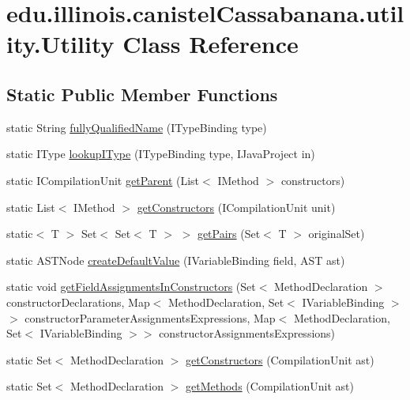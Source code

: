 \hypertarget{classedu_1_1illinois_1_1canistelCassabanana_1_1utility_1_1Utility}{
\section{edu.illinois.canistelCassabanana.utility.Utility Class Reference}
\label{classedu_1_1illinois_1_1canistelCassabanana_1_1utility_1_1Utility}
}
\subsection*{Static Public Member Functions}
\begin{DoxyCompactItemize}
\item 
static String \hyperlink{classedu_1_1illinois_1_1canistelCassabanana_1_1utility_1_1Utility_a7ad7b01b4ac985f843daae80a9b530f6}{fullyQualifiedName} (ITypeBinding type)
\item 
static IType \hyperlink{classedu_1_1illinois_1_1canistelCassabanana_1_1utility_1_1Utility_add7cd8f4956b7b5ebd90c8542183f21e}{lookupIType} (ITypeBinding type, IJavaProject in)
\item 
static ICompilationUnit \hyperlink{classedu_1_1illinois_1_1canistelCassabanana_1_1utility_1_1Utility_a45eff2f6304ebeb68bc077e77faaf41c}{getParent} (List$<$ IMethod $>$ constructors)
\item 
static List$<$ IMethod $>$ \hyperlink{classedu_1_1illinois_1_1canistelCassabanana_1_1utility_1_1Utility_a6cd2cf1ed4823a36a63fb36b4c31cdea}{getConstructors} (ICompilationUnit unit)
\item 
static$<$ T $>$ Set$<$ Set$<$ T $>$ $>$ \hyperlink{classedu_1_1illinois_1_1canistelCassabanana_1_1utility_1_1Utility_aa8be57d974d02d56e0ae832bedcdee08}{getPairs} (Set$<$ T $>$ originalSet)
\item 
static ASTNode \hyperlink{classedu_1_1illinois_1_1canistelCassabanana_1_1utility_1_1Utility_a4dac6bf635efbf16177f98b50f2d8418}{createDefaultValue} (IVariableBinding field, AST ast)
\item 
static void \hyperlink{classedu_1_1illinois_1_1canistelCassabanana_1_1utility_1_1Utility_af883c4cac9ba8bbed2dbf096ed94a9fb}{getFieldAssignmentsInConstructors} (Set$<$ MethodDeclaration $>$ constructorDeclarations, Map$<$ MethodDeclaration, Set$<$ IVariableBinding $>$$>$ constructorParameterAssignmentsExpressions, Map$<$ MethodDeclaration, Set$<$ IVariableBinding $>$$>$ constructorAssignmentsExpressions)
\item 
static Set$<$ MethodDeclaration $>$ \hyperlink{classedu_1_1illinois_1_1canistelCassabanana_1_1utility_1_1Utility_a44aa27794a29b6d115d3ca5e3f18dd3c}{getConstructors} (CompilationUnit ast)
\item 
static Set$<$ MethodDeclaration $>$ \hyperlink{classedu_1_1illinois_1_1canistelCassabanana_1_1utility_1_1Utility_a92d592b310010b841d64d461e0a6ab75}{getMethods} (CompilationUnit ast)
\end{DoxyCompactItemize}


